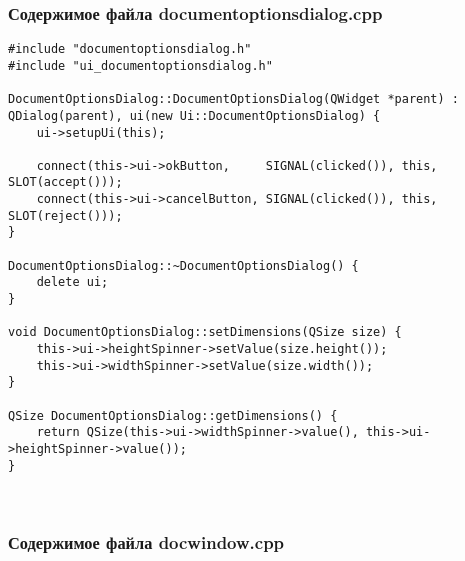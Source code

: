 \subsubsection*{Содержимое файла documentoptionsdialog.cpp}

\begin{lstlisting}
#include "documentoptionsdialog.h"
#include "ui_documentoptionsdialog.h"

DocumentOptionsDialog::DocumentOptionsDialog(QWidget *parent) : QDialog(parent), ui(new Ui::DocumentOptionsDialog) {
    ui->setupUi(this);

    connect(this->ui->okButton,     SIGNAL(clicked()), this, SLOT(accept()));
    connect(this->ui->cancelButton, SIGNAL(clicked()), this, SLOT(reject()));
}

DocumentOptionsDialog::~DocumentOptionsDialog() {
    delete ui;
}

void DocumentOptionsDialog::setDimensions(QSize size) {
    this->ui->heightSpinner->setValue(size.height());
    this->ui->widthSpinner->setValue(size.width());
}

QSize DocumentOptionsDialog::getDimensions() {
    return QSize(this->ui->widthSpinner->value(), this->ui->heightSpinner->value());
}
\end{lstlisting}~\\

\subsubsection*{Содержимое файла docwindow.cpp}

